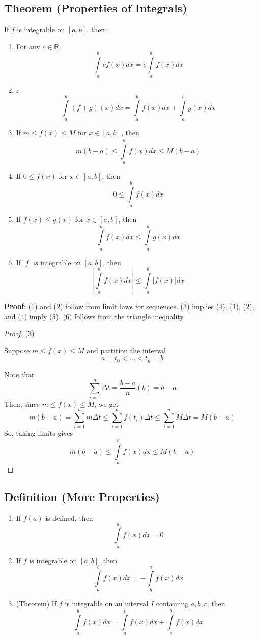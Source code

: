 \subsection{Theorem (Properties of Integrals)}
If $ f $ is integrable on $ [a,b] $, then:
\begin{enumerate}[(1)]
    \item For any $ c\in\mathbb{R} $,
          \[ \int\limits_{a}^{b} cf(x) d{x} = c \int\limits_{a}^{b} f(x) d{x} \]
    \item r
          \[ \int\limits_{a}^{b} (f+g)(x) d{x} = \int\limits_{a}^{b} f(x) d{x} +
              \int\limits_{a}^{b} g(x) d{x} \]
    \item If $ m\le f(x)\le M $ for $ x\in[a,b] $, then
          \[ m(b-a)\le \int\limits_{a}^{b} f(x) d{x} \le M(b-a) \]
    \item If $ 0\le f(x) $ for $ x\in[a,b] $, then
          \[ 0\le \int\limits_{a}^{b} f(x) d{x} \]
    \item If $ f(x)\le g(x) $ for $ x\in[a,b] $, then
          \[ \int\limits_{a}^{b} f(x) d{x} \le \int\limits_{a}^{b} g(x) d{x} \]
    \item If $ |f| $ is integrable on $ [a,b] $, then
          \[ \left|\int\limits_{a}^{b} f(x) d{x}\right|\le \int\limits_{a}^{b} |f(x)| d{x} \]
\end{enumerate}

\textbf{Proof}: (1) and (2) follow from limit laws for sequences. (3) implies (4),
(1), (2), and (4) imply (5). (6) follows from the triangle inequality

\begin{proof} (3)

    Suppose $ m\le f(x)\le M $ and partition the interval
    \[ a=t_0<\dots<t_n=b \]

    Note that
    \[ \sum\limits_{i=1}^{n} \Delta t=\frac{b-a}{n}(b)=b-a \]
    Then, since $ m\le f(x)\le M $, we get
    \[ m(b-a)=\sum\limits_{i=1}^{n} m\Delta t\le \sum\limits_{i=1}^{n} f(t_i)\Delta t
        \le \sum\limits_{i=1}^{n} M\Delta t=M(b-a) \]
    So, taking limits gives
    \[ m(b-a)\le \int\limits_{a}^{b} f(x) d{x} \le M(b-a) \]
\end{proof}

\subsection{Definition (More Properties)}
\begin{enumerate}[(1)]
    \item If $ f(a) $ is defined, then
          \[ \int\limits_{a}^{a} f(x) d{x} =0 \]
    \item If $ f $ is integrable on $ [a,b] $, then
          \[ \int\limits_{a}^{b} f(x) d{x}=-\int\limits_{b}^{a} f(x) d{x} \]
    \item (Theorem) If $ f $ is integrable on an interval $ I $ containing $ a,b,c $, then
          \[ \int\limits_{a}^{b} f(x) d{x}=\int\limits_{a}^{c} f(x) d{x}+\int\limits_{c}^{b} f(x) d{x} \]
\end{enumerate}

